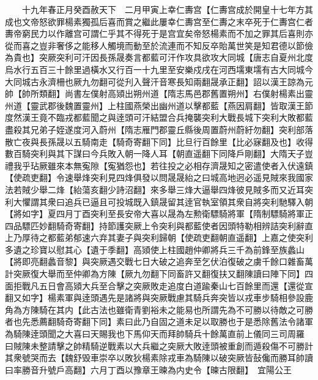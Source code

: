　　十九年春正月癸酉赦天下　二月甲寅上幸仁夀宫【仁夀宫成於開皇十七年方其成也文帝怒欲罪楊素獨孤后喜而賞之繼此屢幸仁夀宫至仁夀之末卒死于仁夀宫仁者夀帝窮民力以作離宫可謂仁乎其不得死于是宫宜矣帝怒楊素而不加之罪其后喜則亦從而喜之豈非奢侈之能移人觸境而動至於流連而不知反卒貽萬世笑是知君德以節儉為貴也】突厥突利可汗因長孫晟奏言都藍可汗作攻具欲攻大同城【唐志自夏州北度烏水行五百三十餘里過橫水又行百一十九里至安樂戍戌在河西壖東壖有古大同城今大同城古永濟柵也厥九勿翻可從刋入聲汗音寒長知兩翻晟承正翻】詔以漢王諒為元帥【帥所類翻】尚書左僕射高熲出朔州道【隋志馬邑郡舊置朔州】右僕射楊素出靈州道【靈武郡後魏置靈州】上柱國燕榮出幽州道以擊都藍【燕因肩翻】皆取漢王節度然漢王竟不臨戎都藍聞之與逹頭可汗結盟合兵掩襲突利大戰長城下突利大敗都藍盡殺其兄弟子姪遂度河入蔚州【隋志雁門郡靈丘縣後周置蔚州蔚紆勿翻】突利部落散亡夜與長孫晟以五騎南走【騎奇寄翻下同】比旦行百餘里【比必寐翻及也】收得數百騎突利與其下謀曰今兵敗入朝一降人耳【朝直遥翻下同降戶剛翻】大隋天子豈禮我乎玷厥雖來本無寃隙【寃猶怨也】若往投之必相存濟晟知之密遣使者入伏遠鎮【使疏吏翻】令速舉烽突利見四烽俱發以問晟晟紿之曰城高地迥必遥見賊來我國家法若賊少舉二烽【紿蕩亥翻少詩沼翻】來多舉三烽大逼舉四烽彼見賊多而又近耳突利大懼謂其衆曰追兵已逼且可投城既入鎮晟留其逹官執室領其衆自將突利馳驛入朝【將如字】夏四月丁酉突利至長安帝大喜以晟為左勲衛驃騎將軍【隋制驃騎將軍正四品驃匹妙翻騎奇寄翻】持節護突厥上令突利與都藍使者因頭特勒相辨詰突利辭直上乃厚待之都藍弟郁速六弃其妻子與突利歸朝【使疏吏翻朝直遥翻】上嘉之使突利多遺之珍寶以慰其心【遺于季翻】高熲使上柱國趙仲卿將兵三千為前鋒至族蠡山【將即亮翻蠡音黎】與突厥遇交戰七日大破之追奔至乞伏泊復破之虜千餘口雜畜萬計突厥復大舉而至仲卿為方陳【厥九勿翻下同畜許又翻復扶又翻陳讀曰陣下同】四面拒戰凡五日會高熲大兵至合擊之突厥敗走追度白道踰秦山七百餘里而還【還從宣翻又如字】楊素軍與逹頭遇先是諸將與突厥戰慮其騎兵奔突皆以戎車步騎相參設鹿角為方陳騎在其内【此古法也雖衛青劉裕未之能易也所謂先為不可勝以待敵之可勝者也先悉薦翻騎奇寄翻下同】素曰此乃自固之道未足以取勝也于是悉除舊法令諸軍為騎陳逹頭聞之大喜曰天賜我也下馬仰天而拜帥騎兵十餘萬直前上儀同三司周羅曰賊陳未整請擊之帥精騎逆戰素以大兵繼之突厥大敗逹頭被重創而遁殺傷不可勝計其衆號哭而去【魏舒毁車崇卒以敗狄楊素除戎車為騎陳以破突厥皆鼔儳而勝耳帥讀曰率勝音升號戶高翻】六月丁酉以豫章王暕為内史令【暕古限翻】　宜陽公王

